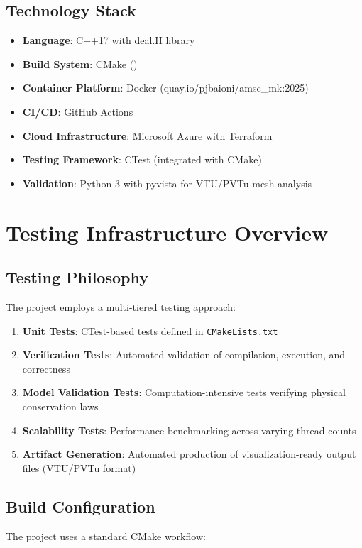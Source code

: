 \documentclass[11pt,a4paper]{article}
\begin{document}
\subsection{Technology Stack}
\begin{itemize}
    \item \textbf{Language}: C++17 with deal.II library
    \item \textbf{Build System}: CMake ()
    \item \textbf{Container Platform}: Docker (quay.io/pjbaioni/amsc\_mk:2025)
    \item \textbf{CI/CD}: GitHub Actions
    \item \textbf{Cloud Infrastructure}: Microsoft Azure with Terraform
    \item \textbf{Testing Framework}: CTest (integrated with CMake)
    \item \textbf{Validation}: Python 3 with pyvista for VTU/PVTu mesh analysis
\end{itemize}

\newpage

\section{Testing Infrastructure Overview}

\subsection{Testing Philosophy}
The project employs a multi-tiered testing approach:
\begin{enumerate}
    \item \textbf{Unit Tests}: CTest-based tests defined in \texttt{CMakeLists.txt}
    \item \textbf{Verification Tests}: Automated validation of compilation, execution, and correctness
    \item \textbf{Model Validation Tests}: Computation-intensive tests verifying physical conservation laws
    \item \textbf{Scalability Tests}: Performance benchmarking across varying thread counts
    \item \textbf{Artifact Generation}: Automated production of visualization-ready output files (VTU/PVTu format)
\end{enumerate}

\subsection{Build Configuration}
The project uses a standard CMake workflow:
\end{document}
